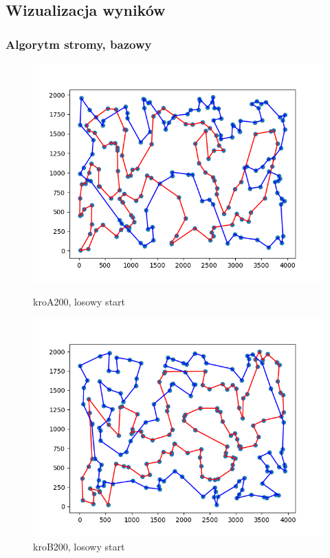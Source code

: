 \documentclass[11pt]{article}
\begin{document}
\subsection{Wizualizacja wyników}\label{subsec:wizualizacja-wynikow}

\subsubsection{Algorytm stromy, bazowy}\label{subsubsec:algorytm-stromy-bazowy}

\begin{figure}[H]
    \begin{minipage}[t]{0.45\textwidth}
        \centering
        \includegraphics[width=\linewidth]{best_paths/kroA200/traverse_steepest_edge}
        \caption{kroA200, losowy start}
    \end{minipage}
    \hfill
    \begin{minipage}[t]{0.45\textwidth}
        \centering
        \includegraphics[width=\linewidth]{best_paths/kroB200/traverse_steepest_edge}
        \caption{kroB200, losowy start}
    \end{minipage}\label{fig:figure1}
\end{figure}
\end{document}
